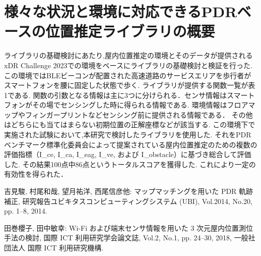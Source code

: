 \documentclass[Japanese]{abstruct}
\begin{document}
\section{様々な状況と環境に対応できるPDRベースの位置推定ライブラリの概要}
ライブラリの基礎検討にあたり,屋内位置推定の環境とそのデータが提供されるxDR Challenge 2023での環境をベースにライブラリの基礎検討と検証を行った.
この環境ではBLEビーコンが配置された高速道路のサービスエリアを歩行者がスマートフォンを腰に固定した状態で歩く.
ライブラリが提供する関数一覧が表1である.
関数の引数となる情報は主に3つに分けられる．センサ情報はスマートフォンがその場でセンシングした時に得られる情報である.
環境情報はフロアマップやフィンガープリントなどセンシング前に提供される情報である．
その他はどちらにも当てはまらない初期位置の正解座標などが該当する.
この環境下で実施された試験において,本研究で検討したライブラリを使用した.
それをPDRベンチマーク標準化委員会によって提案されている屋内位置推定のための複数の
評価指標（I\_ce, I\_ca, I\_eag, I\_ve, および I\_obstacle）に基づき総合して評価した.
その結果100点中86点というトータルスコアを獲得した.
これにより一定の有効性を得られた．

\begin{thebibliography}{2}
	吉見駿, 村尾和哉, 望月祐洋, 西尾信彦他:
	マップマッチングを用いた PDR 軌跡補正,
	研究報告ユビキタスコンピューティングシステム (UBI),
	Vol.2014, No.20, pp. 1--8, 2014.

	田巻櫻子, 田中敏幸:
	Wi-Fi および端末センサ情報を用いた 3 次元屋内位置測位手法の検討,
	国際 ICT 利用研究学会論文誌,
	Vol.2, No.1, pp. 24--30, 2018,
	一般社団法人 国際 ICT 利用研究機構.
\end{thebibliography}
\end{document}
